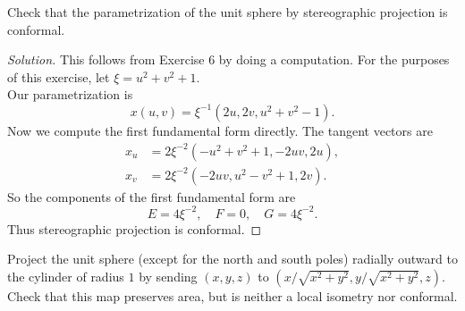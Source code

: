 \documentclass[Shifrin_Solutions_Spring_2018]{subfiles}
\begin{document}
\begin{exercise}
Check that the parametrization of the unit sphere by stereographic projection is conformal.
\end{exercise}

\begin{proof}[Solution] This follows from Exercise 6 by doing a computation. For the purposes of this exercise, let $\xi = u^2+v^2+1$.\\
Our parametrization is
\[
x(u,v) = \xi^{-1} \left( 2u , 2v , u^2 +v^2 -1 \right).
\]
Now we compute the first fundamental form directly. The tangent vectors are
\begin{align*}
x_u & = 2\xi^{-2} \left( -u^2+v^2+1 , -2uv , 2u\right) , \\
x_v &= 2\xi^{-2} \left( -2uv , u^2-v^2 +1 , 2v \right) .
\end{align*}
So the components of the first fundamental form are
\[
E  = 4\xi^{-2} , \quad F = 0 , \quad G = 4\xi^{-2} .
\]
Thus stereographic projection is conformal.
\end{proof}

\begin{exercise}
Project the unit sphere (except for the north and south poles) radially outward to the cylinder of radius $1$ by sending $(x,y,z)$ to $(x/\sqrt{x^2+y^2} , y/\sqrt{x^2+y^2} , z)$. Check that this map preserves area, but is neither a local isometry nor conformal.
\end{exercise}
\end{document}
